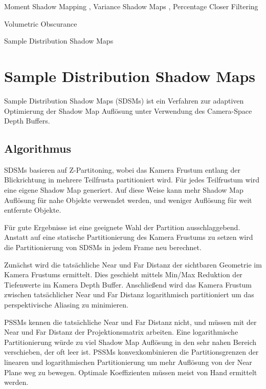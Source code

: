 \documentclass[runningheaders,a4paper]{llncs}
\begin{document}
Moment Shadow Mapping \cite{msm}, Variance Shadow Maps \cite{donnelly2006variance}, Percentage Closer Filtering \cite{reeves1987rendering}

Volumetric Obscurance \cite{loos2010volumetric}

Sample Distribution Shadow Maps \cite{lauritzen2011sample}

\section{Sample Distribution Shadow Maps}

Sample Distribution Shadow Maps (SDSMs) ist ein Verfahren zur adaptiven Optimierung der Shadow Map Auflösung unter Verwendung des Camera-Space Depth Buffers.

\subsection{Algorithmus}

SDSMs basieren auf Z-Partitoning, wobei das Kamera Frustum entlang der Blickrichtung in mehrere Teilfrusta partitioniert wird. Für jedes Teilfrustum wird eine eigene Shadow Map generiert.
Auf diese Weise kann mehr Shadow Map Auflösung für nahe Objekte verwendet werden, und weniger Auflösung für weit entfernte Objekte.

Für gute Ergebnisse ist eine geeignete Wahl der Partition ausschlaggebend.
Anstatt auf eine statische Partitionierung des Kamera Frustums zu setzen wird die Partitionierung von SDSMs in jedem Frame neu berechnet.

Zunächst wird die tatsächliche Near und Far Distanz der sichtbaren Geometrie im Kamera Frustums ermittelt. Dies geschieht mittels Min/Max Reduktion der Tiefenwerte im Kamera Depth Buffer.
Anschließend wird das Kamera Frustum zwischen tatsächlicher Near und Far Distanz logarithmisch partitioniert um das perspektivische Aliasing zu minimieren.

PSSMs kennen die tatsächliche Near und Far Distanz nicht, und müssen mit der Near und Far Distanz der Projektionsmatrix arbeiten.
Eine logarithmische Partitionierung würde zu viel Shadow Map Auflösung in den sehr nahen Bereich verschieben, der oft leer ist.
PSSMs konvexkombinieren die Partitionsgrenzen der linearen und logarithmischen Partitionierung um mehr Auflösung von der Near Plane weg zu bewegen.
Optimale Koeffizienten müssen meist von Hand ermittelt werden.
\end{document}
